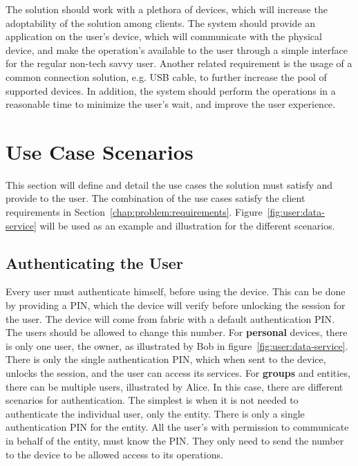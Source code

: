 The solution should work with a plethora of devices, which will increase the adoptability of the solution among clients.
The system should provide an application on the user's device, which will communicate with the physical device, and make the operation's available to the user through a simple interface for the regular non-tech savvy user.
Another related requirement is the usage of a common connection solution, e.g. \ac{USB} cable, to further increase the pool of supported devices.
In addition, the system should perform the operations in a reasonable time to minimize the user's wait, and improve the user experience.

\section{Use Case Scenarios}\label{chap:problem:scenarios}

This section will define and detail the use cases the solution must satisfy and provide to the user. The combination of the use cases satisfy the client requirements in Section~\ref{chap:problem:requirements}.
Figure~\ref{fig:user:data-service} will be used as an example and illustration for the different scenarios.


\subsection{Authenticating the User}\label{chap:problem:scenarios:auth}

Every user must authenticate himself, before using the device. This can be done by providing a \ac{PIN}, which the device will verify before unlocking the session for the user.
The device will come from fabric with a default authentication \ac{PIN}. The users should be allowed to change this number.
For \textbf{personal} devices, there is only one user, the owner, as illustrated by Bob in figure~\ref{fig:user:data-service}. There is only the single authentication \ac{PIN}, which when sent to the device, unlocks the session, and the user can access its services.
For \textbf{groups} and entities, there can be multiple users, illustrated by Alice. In this case, there are different scenarios for authentication.
The simplest is when it is not needed to authenticate the individual user, only the entity. There is only a single authentication \ac{PIN} for the entity. All the user's with permission to communicate in behalf of the entity, must know the \ac{PIN}. They only need to send the number to the device to be allowed access to its operations.

